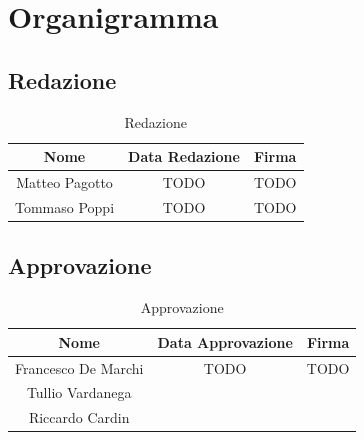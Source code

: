 \section{Organigramma}

\subsection{Redazione}

\renewcommand{\arraystretch}{1}
	\begin{table}[H]
		\begin{center}
			\setlength{\aboverulesep}{0pt}
			\setlength{\belowrulesep}{0pt}
			\setlength{\extrarowheight}{.75ex}
			\begin{tabular}{ c c c }
				\rowcolor{AzzurroGruppo!30} 
				\textbf{Nome} & \textbf{Data Redazione} & \textbf{Firma} \\
				\toprule
				Matteo Pagotto & TODO & TODO \\
                Tommaso Poppi & TODO & TODO \\
				\bottomrule
			\end{tabular}
			\caption{Redazione}
		\end{center}
	\end{table}

\subsection{Approvazione}

\renewcommand{\arraystretch}{1}
	\begin{table}[H]
		\begin{center}
			\setlength{\aboverulesep}{0pt}
			\setlength{\belowrulesep}{0pt}
			\setlength{\extrarowheight}{.75ex}
			\begin{tabular}{ c c c}
				\rowcolor{AzzurroGruppo!30} 
				\textbf{Nome} & \textbf{Data Approvazione} & \textbf{Firma} \\
				\toprule
				Francesco De Marchi & TODO & TODO \\
                Tullio Vardanega & & \\
                Riccardo Cardin & & \\
				\bottomrule
			\end{tabular}
			\caption{Approvazione}
		\end{center}
    \end{table}

